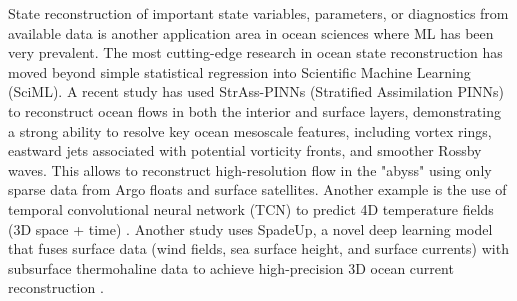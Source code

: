 \documentclass{article}
\begin{document}
State reconstruction of important state variables, parameters, or diagnostics from available data is another application area in ocean sciences where ML has been very prevalent. The most cutting-edge research in ocean state reconstruction has moved beyond simple statistical regression into Scientific Machine Learning (SciML). A recent study has used StrAss-PINNs (Stratified Assimilation PINNs) \citep{limousin2025deep} to reconstruct ocean flows in both the interior and surface layers, demonstrating a strong ability to resolve key ocean mesoscale features, including vortex rings, eastward jets associated with potential vorticity fronts, and smoother Rossby waves.
This allows to reconstruct high-resolution flow in the "abyss" using only sparse data from Argo floats and surface satellites. Another example is the use of temporal convolutional neural network (TCN) to predict 4D temperature fields (3D space + time) \citep{champenois2024machine}. Another study uses SpadeUp, a novel deep learning model that fuses surface data (wind fields, sea surface height, and surface currents) with subsurface thermohaline data to achieve high-precision 3D ocean current reconstruction \citep{li2025deep}.
\end{document}
